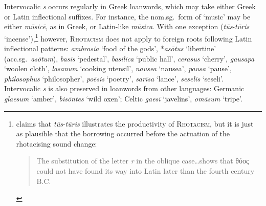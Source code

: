 Intervocalic \emph{s} occurs regularly in Greek loanwords, which may take either Greek or Latin inflectional suffixes.
For instance, the nom.sg.~form of `music' may be either \emph{mūsicē}, as in Greek, or Latin-like \emph{mūsica}.
With one exception (\emph{tūs}-\emph{tūris} `incense'),\footnote{
    \citeauthor{KiparskyInPress} claims that \emph{tūs}-\emph{tūris} illustrates the productivity of \textsc{Rhotacism}, but it is just as plausible that the borrowing occurred before the actuation of the rhotacising sound change:

\begin{quote}
The substitution of the letter \emph{r} in the oblique case\ldots{}shows
that θύος could not have found its way into Latin later than the fourth
century B.C. \cite[507]{Thiselton-Dyer1911}
\end{quote}}
however, \textsc{Rhotacism} does not apply to foreign roots following Latin inflectional patterns: \emph{ambrosia} `food of the gods', *\emph{asōtus} `libertine' (acc.sg.~\emph{asōtum}), \emph{basis} `pedestal', \emph{basilica} `public hall', \emph{cerasus} `cherry', \emph{gausapa} `woolen cloth', \emph{lasanum} `cooking utensil', \emph{nausea} `nausea', \emph{pausa} `pause', \emph{philosophus} `philosopher', \emph{poēsis} `poetry', \emph{sarīsa} `lance', \emph{seselis} `seseli'.
Intervocalic \emph{s} is also preserved in loanwords from other languages: Germanic \emph{glaesum} `amber', \emph{bisōntes} `wild oxen'; Celtic \emph{gaesī} `javelins', \emph{omāsum} `tripe'.

